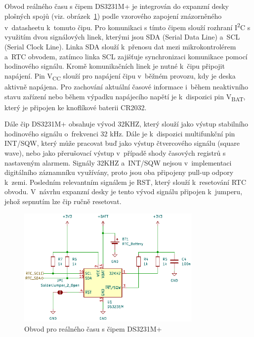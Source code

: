 Obvod reálného času s čipem DS3231M+ je integrován do expanzní desky plošných spojů (viz. obrázek~\ref{fig:ds3231m+}) podle vzorového zapojení znázorněného v~datasheetu k~tomuto čipu. Pro komunikaci s tímto čipem slouží rozhraní I\textsuperscript{2}C s využitím dvou signálových linek, kterými jsou SDA (Serial Data Line) a~SCL (Serial Clock Line). Linka SDA slouží k~přenosu dat mezi mikrokontrolérem a~RTC obvodem, zatímco linka SCL zajišťuje synchronizaci komunikace pomocí hodinového signálu. Kromě komunikačních linek je nutné k~čipu připojit napájení. Pin V\textsubscript{CC} slouží pro napájení čipu v~běžném provozu, kdy je deska aktivně napájena. Pro zachování aktuální časové informace i~během neaktivního stavu zařízení nebo během výpadku napájecího napětí je k~dispozici pin V\textsubscript{BAT}, který je připojen ke knoflíkové baterii CR2032.~\cite{DS3231_manual}

Dále čip DS3231M+ obsahuje vývod 32KHZ, který slouží jako výstup stabilního hodinového signálu o~frekvenci 32 kHz. Dále je k~dispozici multifunkční pin INT/SQW, který může pracovat buď jako výstup čtvercového signálu (square wave), nebo jako přerušovací výstup v~případě shody časových registrů s nastaveným alarmem. Signály 32KHZ a~INT/SQW nejsou v~implementaci digitálního záznamníku využívány, proto jsou oba připojeny pull-up odpory k~zemi. Posledním relevantním signálem je RST, který slouží k~resetování RTC obvodu. V~návrhu expanzní desky je tento vývod signálu připojen k~jumperu, jehož sepnutím lze čip ručně resetovat.~\cite{DS3231_manual}

\begin{figure}[h]
    \centering
    \includegraphics[width=0.80\textwidth]{obrazky-figures/ds3231m+.pdf}
    
    \caption{Obvod pro reálného času s čipem DS3231M+}
    \label{fig:ds3231m+}
\end{figure}

